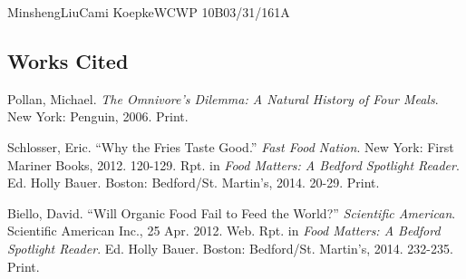 \documentclass[12pt,letterpaper]{article}
\begin{document}
\begin{mla}{Minsheng}{Liu}{Cami Koepke}{WCWP 10B}{03/31/16}{1A}
\subsection*{Works Cited}
\bibent Pollan, Michael. \textit{The Omnivore's Dilemma: A Natural History of Four Meals}. New York: Penguin, 2006. Print.

\bibent Schlosser, Eric. ``Why the Fries Taste Good.'' \textit{Fast Food Nation}. New York: First Mariner Books, 2012. 120-129. Rpt. in \textit{Food Matters: A Bedford Spotlight Reader}. Ed. Holly Bauer. Boston: Bedford/St. Martin's, 2014. 20-29. Print.

\bibent Biello, David. ``Will Organic Food Fail to Feed the World?'' \textit{Scientific American}. Scientific American Inc., 25 Apr. 2012. Web. Rpt. in \textit{Food Matters: A Bedford Spotlight Reader}. Ed. Holly Bauer. Boston: Bedford/St. Martin's, 2014. 232-235. Print.

\end{mla}
\end{document}
